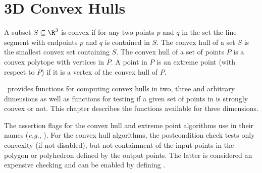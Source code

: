
\chapter{3D Convex Hulls}
\label{chap:convex_hull_3_ref}

A subset $S \subseteq \R^3$ is convex if for any two points $p$ and $q$
in the set the line segment with endpoints $p$ and $q$ is contained
in $S$. The convex hull of a set $S$ is 
the smallest convex set containing
$S$. The convex hull of a set of points $P$ is a convex 
polytope with vertices in $P$.  A point in $P$ is an extreme point 
(with respect to $P$) if it is a vertex 
of the convex hull of $P$.

\cgal\ provides functions for computing convex hulls in two, three 
and arbitrary dimensions as well as functions for testing if a given set of 
points in is strongly convex or not.  This chapter describes the functions
available for three dimensions. 


The assertion flags for the convex hull and extreme point algorithms
use  in their names (\textit{e.g.}, ).
For the convex hull algorithms, the postcondition
check tests only convexity (if not disabled), but not containment of the
input points in the polygon or polyhedron defined by the output points.
The latter is considered an expensive checking and can be enabled by
defining %
.



\\
\\
\\
\\
 \\

